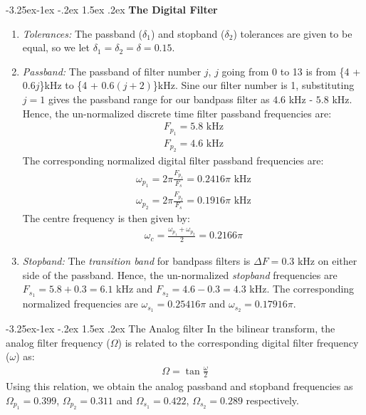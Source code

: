 \documentclass[article]{IEEEtran}
\makeatletter
\theoremstyle{remark}
\numberwithin{equation}{subsection}
\renewcommand\subsection{\@startsection{subsection}{2}{\z@}%
    {-3.25ex\@plus -1ex \@minus -.2ex}%
    {1.5ex \@plus .2ex}%
    {\normalfont\large\bfseries}}
\makeatother
\begin{document}
\subsection{\textbf{The Digital Filter}}
\begin{enumerate}[label = \roman*)]
    \item \textit{Tolerances:} The passband ($\delta_1$) and stopband ($\delta_2$) tolerances are given to be equal, so we let $\delta_1 = \delta_2 = \delta = 0.15$.
    
    \item \textit{Passband:} The passband of filter number $j$, $j$ going from 0 to 13 is from \{4 + 0.6$j$\}kHz to \{4 + 0.6$(j + 2)$\}kHz. Sine our filter number is 1, substituting $j = 1$ gives the passband range for our bandpass filter as $4.6$ kHz - $5.8$ kHz. Hence, the un-normalized discrete time filter passband frequencies are:
    \begin{align}
        F_{p_1} = 5.8 \text{ kHz}\\
        F_{p_2} = 4.6 \text{ kHz}
    \end{align} The corresponding normalized digital filter passband frequencies are:
    \begin{align}
        \omega_{p_1} = 2\pi\frac{F_{p_1}}{F_s}  = 0.2416\pi\text{ kHz}\\
        \omega_{p_2} = 2\pi\frac{F_{p_2}}{F_s}  = 0.1916 \pi \text{ kHz}
    \end{align} The centre frequency is then given by:
    \begin{align}
        \omega_c = \frac{\omega_{p_1} + \omega_{p_2}}{2} = 0.2166\pi
    \end{align}  
    
    \item \textit{Stopband:} The \textit{transition band} for bandpass filters is $\Delta F = 0.3$ kHz on either side of the passband. Hence, the un-normalized \textit{stopband} frequencies are $F_{s_1} = 5.8 + 0.3 = 6.1$ kHz and $F_{s_2} = 4.6 - 0.3 = 4.3$ kHz. The corresponding normalized frequencies are $\omega_{s_1} = 0.25416 \pi$ and $\omega_{s_2} = 0.17916 \pi$.
\end{enumerate}
\subsection{The Analog filter}
In the bilinear transform, the analog filter frequency ($\Omega$) is related to the corresponding digital filter frequency ($\omega$) as:
\begin{align}
    \Omega = \tan \frac{\omega}{2}
\end{align} Using this relation, we obtain the analog passband and stopband frequencies as $\Omega_{p_1} = 0.399$, $\Omega_{p_2} = 0.311$ and $\Omega_{s_1} = 0.422$, $\Omega_{s_2} = 0.289$
respectively.
\end{document}
